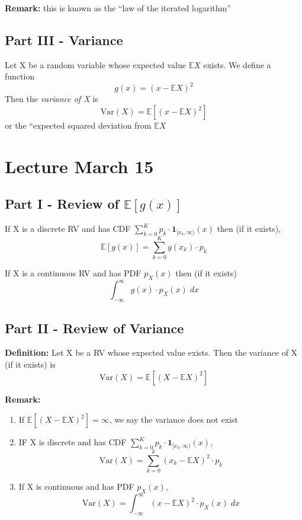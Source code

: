 \documentclass[12pt]{article}
\begin{document}
\textbf{Remark:} this is known as the ``law of the iterated logarithm'' 

\subsection*{Part III - Variance}
Let X be a random variable whose expected value $\mathbb{E}X$ exists. We define a function 
\[g(x) = (x - \mathbb{E}X)^2\]
Then the \emph{variance of X} is 
\[\text{Var}(X) = \mathbb{E}[(x - \mathbb{E}X)^2]\]
or the ``expected squared deviation from $\mathbb{E}X$

\section*{Lecture March 15}
\subsection*{Part I - Review of $\mathbb{E}[g(x)]$}
If X is a discrete RV and has CDF $\sum_{k=0}^K p_k \cdot \mathbf{1}_{[x_k, \infty)}(x)$ then (if it exists), 
\[\mathbb{E}[g(x)] = \sum_{k=0}^K g(x_k) \cdot p_k\]

If X is a continuous RV and has PDF $p_X(x)$ then (if it exists) 
\[\int_{-\infty}^{\infty} g(x) \cdot p_X(x)\; dx\]

\subsection*{Part II - Review of Variance}
\textbf{Definition:} Let X be a RV whose expected value exists. Then the variance of X (if it exists) is 
\[\text{Var}(X) = \mathbb{E}[(X - \mathbb{E}X)^2]\]

\textbf{Remark:}
\begin{enumerate}
    \item If $\mathbb{E}[(X - \mathbb{E}X)^2] = \infty$, we say the variance does not exist 
    \item IF X is discrete and has CDF  $\sum_{k=0}^K p_k \cdot \mathbf{1}_{[x_k, \infty)}(x)$, 
    \[\text{Var}(X) = \sum_{k=0}^k (x_k - \mathbb{E}X)^2 \cdot p_k\]
    \item If X is continuous and has PDF $p_X(x)$,
    \[\text{Var}(X) = \int_{-\infty}^{\infty} (x - \mathbb{E}X)^2 \cdot p_X(x)\; dx\]
\end{enumerate}
\end{document}
